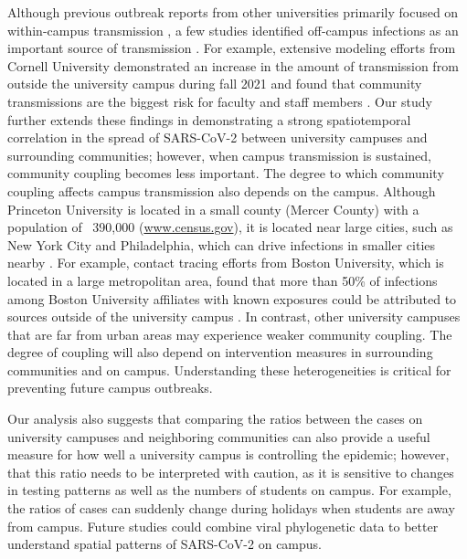 \documentclass[12pt]{article}
\begin{document}
Although previous outbreak reports from other universities primarily focused on within-campus transmission \citep{wilson2020multiple,currie2021interventions}, a few studies identified off-campus infections as an important source of transmission \citep{fox2021response,hamer2021assessment}.
For example, extensive modeling efforts from Cornell University demonstrated an increase in the amount of transmission from outside the university campus during fall 2021 and found that community transmissions are the biggest risk for faculty and staff members \citep{frazier2022modeling}.
Our study further extends these findings in demonstrating a strong spatiotemporal correlation in the spread of SARS-CoV-2 between university campuses and surrounding communities;
however, when campus transmission is sustained, community coupling becomes less important.
The degree to which community coupling affects campus transmission also depends on the campus. 
Although Princeton University is located in a small county (Mercer County) with a population of ~390,000 (\url{www.census.gov}), it is located near large cities, such as New York City and Philadelphia, which can drive infections in smaller cities nearby \citep{grenfell1997meta}.
For example, contact tracing efforts from Boston University, which is located in a large metropolitan area, found that more than 50\% of infections among Boston University affiliates with known exposures could be attributed to sources outside of the university campus \citep{hamer2021assessment}.
In contrast, other university campuses that are far from urban areas may experience weaker community coupling.
The degree of coupling will also depend on intervention measures in surrounding communities and on campus.
Understanding these heterogeneities is critical for preventing future campus outbreaks.

Our analysis also suggests that comparing the ratios between the cases on university campuses and neighboring communities can also provide a useful measure for how well a university campus is controlling the epidemic; 
however, that this ratio needs to be interpreted with caution, as it is sensitive to changes in testing patterns as well as the numbers of students on campus.
For example, the ratios of cases can suddenly change during holidays when students are away from campus.
Future studies could combine viral phylogenetic data to better understand spatial patterns of SARS-CoV-2 on campus.
\end{document}
